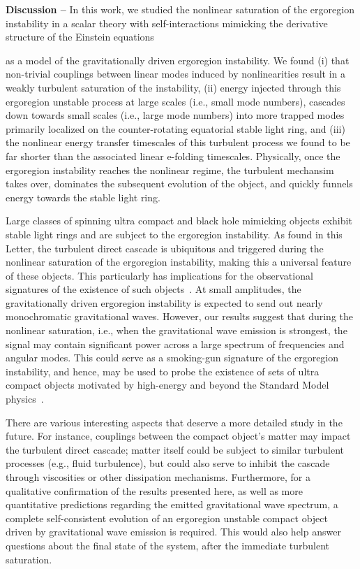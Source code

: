 \documentclass[aps,prl,notitlepage,superscriptaddress,twocolumn]{revtex4-1}
\newcommand{\red}[1]{{{#1}}}
\begin{document}
\textbf{Discussion --} In this work, we studied the nonlinear saturation of the ergoregion instability in a scalar theory with self-interactions mimicking the derivative structure of the Einstein equations \red{as a model of the gravitationally driven ergoregion instability. We found (i) that non-trivial couplings between linear modes induced by nonlinearities result in a weakly turbulent saturation of the instability, (ii) energy injected through this ergoregion unstable process at large scales (i.e., small mode numbers), cascades down towards small scales (i.e., large mode numbers) into more trapped modes primarily localized on the counter-rotating equatorial stable light ring, and (iii) the nonlinear energy transfer timescales of this turbulent process we found to be far shorter than the associated linear e-folding timescales. Physically, once the ergoregion instability reaches the nonlinear regime, the turbulent mechansim takes over, dominates the subsequent evolution of the object, and quickly funnels energy towards the stable light ring.

Large classes of spinning ultra compact and black hole mimicking objects exhibit stable light rings and are subject to the ergoregion instability. As found in this Letter, the turbulent direct cascade is ubiquitous and triggered during the nonlinear saturation of the ergoregion instability, making this a universal feature of these objects. This particularly has implications for the observational signatures of the existence of such objects~\cite{Barausse:2018vdb,Mastrogiovanni:2025ixe,Fan:2017cfw}. At small amplitudes, the gravitationally driven ergoregion instability is expected to send out nearly monochromatic gravitational waves. However, our results suggest that during the nonlinear saturation, i.e., when the gravitational wave emission is strongest, the signal may contain significant power across a large spectrum of frequencies and angular modes. This could serve as a smoking-gun signature of the ergoregion instability, and hence, may be used to probe the existence of sets of ultra compact objects motivated by high-energy and beyond the Standard Model physics~\cite{Cardoso:2019rvt,Carballo-Rubio:2025fnc,Bambi:2025wjx}.

There are various interesting aspects that deserve a more detailed study in the future. For instance, couplings between the compact object's matter may impact the turbulent direct cascade; matter itself could be subject to similar turbulent processes (e.g., fluid turbulence), but could also serve to inhibit the cascade through viscosities or other dissipation mechanisms. Furthermore, for a qualitative confirmation of the results presented here, as well as more quantitative predictions regarding the emitted gravitational wave spectrum, a complete self-consistent evolution of an ergoregion unstable compact object driven by gravitational wave emission is required. This would also help answer questions about the final state of the system, after the immediate turbulent saturation.}
\end{document}
